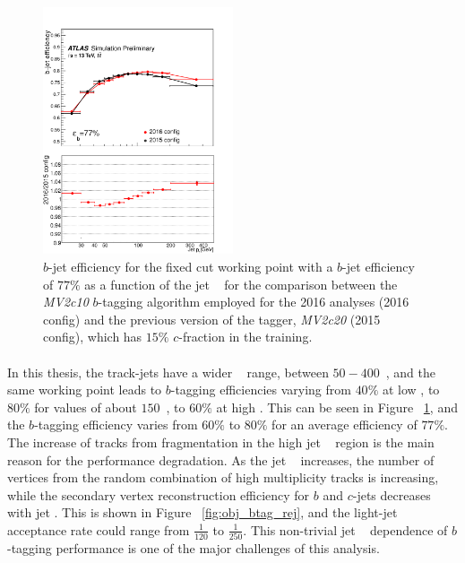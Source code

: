 \begin{figure}[htbp!]
  \centering
  \captionsetup{justification=centering}
  \includegraphics[width=0.5\textwidth]{figures/object/b_eff_pt}
   \caption{$b$-jet efficiency for the fixed cut working point with a $b$-jet efficiency of $77\%$ as a function of the jet \pt~ for the comparison between the \emph{MV2c10} $b$-tagging algorithm employed for the 2016 analyses (2016 config) and the previous version of the tagger, \emph{MV2c20} (2015 config), which has $15\%$ $c$-fraction in the training.}
  \label{fig:obj_b_eff}
\end{figure}

\paragraph{}
In this thesis, the track-jets have a wider \pt~ range, between $50-400$~\GeV, and the same working point leads to $b$-tagging efficiencies varying from $40\%$ at low \pt, to $80\%$ for \pt values of about $150$~\GeV, to $60\%$ at high \pt. 
This can be seen in Figure ~\ref{fig:obj_b_eff}, and the $b$-tagging efficiency varies from $60\%$ to $80\%$ for an average efficiency of $77\%$.
The increase of tracks from fragmentation in the high jet \pt~ region is the main reason for the performance degradation. 
As the jet \pt~ increases, the number of vertices from the random combination of high multiplicity tracks is increasing, while the secondary vertex reconstruction efficiency for $b$ and $c$-jets decreases with jet \pt.
This is shown in Figure ~\ref{fig:obj_btag_rej}, and the light-jet acceptance rate could range from $\frac{1}{120}$ to $\frac{1}{250}$.
This non-trivial jet \pt~ dependence of $b$-tagging performance is one of the major challenges of this analysis.

